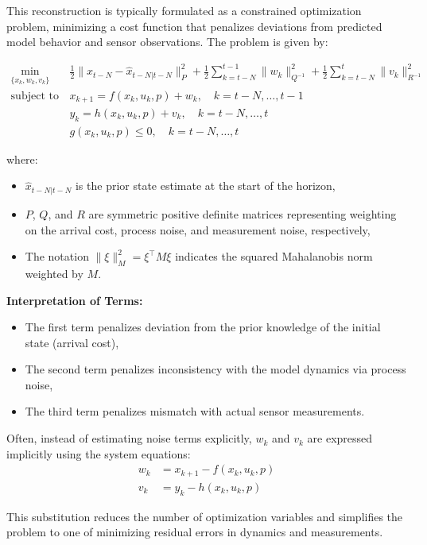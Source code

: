 This reconstruction is typically formulated as a constrained optimization problem, minimizing a cost function that penalizes deviations from predicted model behavior and sensor observations. The problem is given by:

\begin{align}
    \min_{\{x_k, w_k, v_k\}} \quad & \frac{1}{2} \|x_{t-N} - \hat{x}_{t-N|t-N}\|_P^2 + \frac{1}{2} \sum_{k=t-N}^{t-1} \|w_k\|_{Q^{-1}}^2 + \frac{1}{2} \sum_{k=t-N}^{t} \|v_k\|_{R^{-1}}^2 \label{eq:cost_function} \\
    \text{subject to} \quad & x_{k+1} = f(x_k, u_k, p) + w_k, \quad k = t-N, \ldots, t-1 \\
    & y_k = h(x_k, u_k, p) + v_k, \quad k = t-N, \ldots, t \\
    & g(x_k, u_k, p) \leq 0, \quad k = t-N, \ldots, t
\end{align}

where:
\begin{itemize}
    \item $\hat{x}_{t-N|t-N}$ is the prior state estimate at the start of the horizon,
    \item $P$, $Q$, and $R$ are symmetric positive definite matrices representing weighting on the arrival cost, process noise, and measurement noise, respectively,
    \item The notation $\| \xi \|_M^2 = \xi^\top M \xi$ indicates the squared Mahalanobis norm weighted by $M$.
\end{itemize}

\textbf{Interpretation of Terms:}
\begin{itemize}
    \item The first term penalizes deviation from the prior knowledge of the initial state (arrival cost),
    \item The second term penalizes inconsistency with the model dynamics via process noise,
    \item The third term penalizes mismatch with actual sensor measurements.
\end{itemize}

Often, instead of estimating noise terms explicitly, $w_k$ and $v_k$ are expressed implicitly using the system equations:
\begin{align}
    w_k &= x_{k+1} - f(x_k, u_k, p) \\
    v_k &= y_k - h(x_k, u_k, p)
\end{align}

This substitution reduces the number of optimization variables and simplifies the problem to one of minimizing residual errors in dynamics and measurements.

